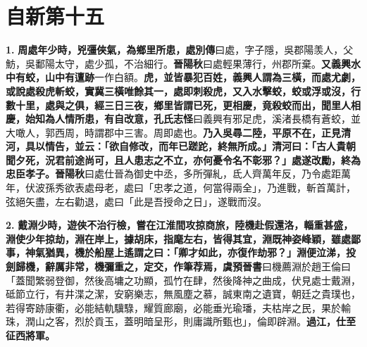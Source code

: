\chapter{自新第十五}

\textbf{1.} \textbf{周處年少時，兇彊俠氣，為鄉里所患，}{\footnotesize \textbf{處別傳}曰處，字子隱，吳郡陽羡人，父魴，吳鄱陽太守，處少孤，不治細行。\textbf{晉陽秋}曰處輕果薄行，州郡所棄。}\textbf{又義興水中有蛟，山中有邅跡}{\footnotesize 一作白額。}\textbf{虎，並皆暴犯百姓，義興人謂為三橫，而處尤劇，或說處殺虎斬蛟，實冀三橫唯餘其一，處即刺殺虎，又入水擊蛟，蛟或浮或沒，行數十里，處與之俱，經三日三夜，鄉里皆謂已死，更相慶，竟殺蛟而出，聞里人相慶，始知為人情所患，有自改意，}{\footnotesize \textbf{孔氏志怪}曰義興有邪足虎，溪渚長橋有蒼蛟，並大噉人，郭西周，時謂郡中三害。周即處也。}\textbf{乃入吳尋二陸，平原不在，正見清河，具以情告，並云：「欲自修改，而年已蹉跎，終無所成。」清河曰：「古人貴朝聞夕死，況君前途尚可，且人患志之不立，亦何憂令名不彰邪？」處遂改勵，終為忠臣孝子。}{\footnotesize \textbf{晉陽秋}曰處仕晉為御史中丞，多所彈糺，氐人齊萬年反，乃令處距萬年，伏波孫秀欲表處母老，處曰「忠孝之道，何當得兩全」，乃進戰，斬首萬計，弦絕矢盡，左右勸退，處曰「此是吾授命之日」，遂戰而沒。}

\textbf{2.} \textbf{戴淵少時，遊俠不治行檢，嘗在江淮間攻掠商旅，陸機赴假還洛，輜重甚盛，淵使少年掠劫，淵在岸上，據胡床，指麾左右，皆得其宜，淵既神姿峰穎，雖處鄙事，神氣猶異，機於船屋上遙謂之曰：「卿才如此，亦復作劫邪？」淵便泣涕，投劍歸機，辭厲非常，機彌重之，定交，作筆荐焉，}{\footnotesize \textbf{虞預晉書}曰機薦淵於趙王倫曰「蓋聞繁弱登御，然後高墉之功顯，孤竹在肆，然後降神之曲成，伏見處士戴淵，砥節立行，有井渫之潔，安窮樂志，無風塵之慕，誠東南之遺寶，朝廷之貴璞也，若得寄跡康衢，必能結軌驥騄，耀質廊廟，必能垂光瑜璠，夫枯岸之民，果於輸珠，潤山之客，烈於貢玉，蓋明暗呈形，則庸識所甄也」，倫即辟淵。}\textbf{過江，仕至征西將軍。}